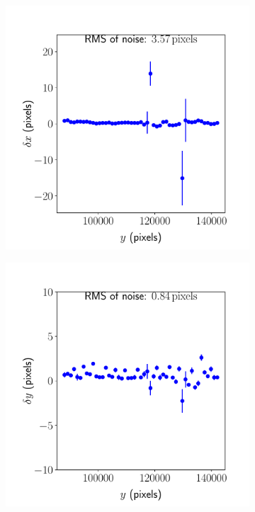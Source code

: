 \documentclass{article}
\begin{document}
\begin{figure}[ht]
\begin{subfigure}{0.24\linewidth}
		\caption{}
		\label{fig:sinewave2yxBMS}
	\end{subfigure}
	\begin{subfigure}{0.24\linewidth}
		\includegraphics[width=\linewidth]{sine-wave-2-xy-BMS.pdf}
		\caption{}
		\label{fig:sinewave2xyBMS}
	\end{subfigure}
	\begin{subfigure}{0.24\linewidth}
		\includegraphics[width=\linewidth]{sine-wave-2-yy-BMS.pdf}

\end{subfigure}
\end{figure}
\end{document}
